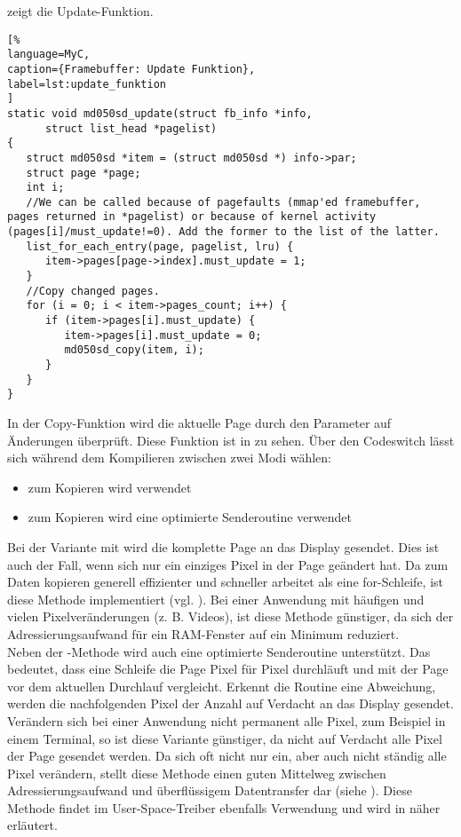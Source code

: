  zeigt die Update-Funktion.
\begin{lstlisting}[%
language=MyC,
caption={Framebuffer: Update Funktion},
label=lst:update_funktion
]
static void md050sd_update(struct fb_info *info,
      struct list_head *pagelist)
{
   struct md050sd *item = (struct md050sd *) info->par;
   struct page *page;
   int i;
   //We can be called because of pagefaults (mmap'ed framebuffer, pages returned in *pagelist) or because of kernel activity (pages[i]/must_update!=0). Add the former to the list of the latter.
   list_for_each_entry(page, pagelist, lru) {
      item->pages[page->index].must_update = 1;
   }
   //Copy changed pages.
   for (i = 0; i < item->pages_count; i++) {
      if (item->pages[i].must_update) {
         item->pages[i].must_update = 0;
         md050sd_copy(item, i);
      }
   }
}
\end{lstlisting}
In der Copy-Funktion wird die aktuelle Page durch den Parameter  auf Änderungen überprüft. Diese Funktion ist in  zu sehen. Über den Codeswitch  lässt sich während dem Kompilieren zwischen zwei Modi wählen:
\begin{itemize}
	\item zum Kopieren wird  verwendet
	\item zum Kopieren wird eine optimierte Senderoutine verwendet
\end{itemize}

Bei der Variante mit  wird die komplette Page an das Display gesendet. Dies ist auch der Fall, wenn sich nur ein einziges Pixel in der Page geändert hat. Da zum Daten kopieren  generell effizienter und schneller arbeitet als eine for-Schleife, ist diese Methode implementiert (vgl. \cite{Nadeau2012}). 
Bei einer Anwendung mit häufigen und vielen Pixelveränderungen (z. B. Videos), ist diese Methode günstiger, da sich der Adressierungsaufwand für ein RAM-Fenster auf ein Minimum reduziert.\\
Neben der -Methode wird auch eine optimierte Senderoutine unterstützt. Das bedeutet, dass eine Schleife die Page Pixel für Pixel durchläuft und mit der Page vor dem aktuellen Durchlauf vergleicht. Erkennt die Routine eine Abweichung, werden die nachfolgenden Pixel der Anzahl  auf Verdacht an das Display gesendet. Verändern sich bei einer Anwendung nicht permanent alle Pixel, zum Beispiel in einem Terminal, so ist diese Variante günstiger, da nicht auf Verdacht alle Pixel der Page gesendet werden. Da sich oft nicht nur ein, aber auch nicht ständig alle Pixel  verändern, stellt diese Methode einen guten Mittelweg zwischen Adressierungsaufwand und überflüssigem Datentransfer dar (siehe \cite{Schlegel2013a}). Diese Methode findet im User-Space-Treiber ebenfalls Verwendung und wird in  näher erläutert.

